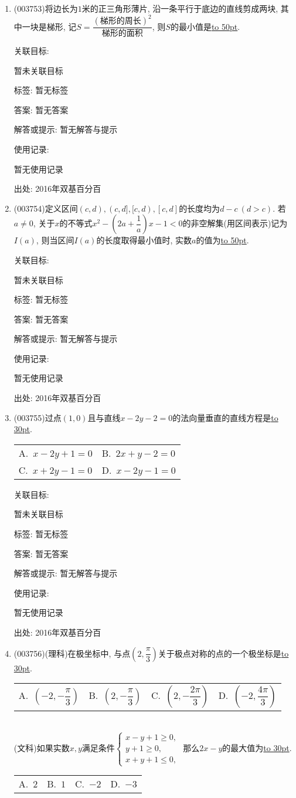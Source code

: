 \documentclass[10pt,a4paper]{article}
\newcommand{\blank}[1]{\underline{\hbox to #1pt{}}}
\newcommand{\twoch}[4]{\par\begin{tabular}{p{.46\textwidth}p{.46\textwidth}}
A.~#1& B.~#2\\
C.~#3& D.~#4
\end{tabular}}
\newcommand{\fourch}[4]{\par\begin{tabular}{p{.23\textwidth}p{.23\textwidth}p{.23\textwidth}p{.23\textwidth}}
A.~#1 &B.~#2& C.~#3& D.~#4
\end{tabular}}
\begin{document}
\begin{enumerate}[1.]
关联目标:

暂未关联目标



标签: 暂无标签

答案: 暂无答案

解答或提示: 暂无解答与提示

使用记录:

暂无使用记录


出处: 2016年双基百分百
\item { (003753)}将边长为$1$米的正三角形薄片, 沿一条平行于底边的直线剪成两块, 其中一块是梯形, 记$S=\dfrac{(\text{梯形的周长})^2}{\text{梯形的面积}}$, 则$S$的最小值是\blank{50}.


关联目标:

暂未关联目标



标签: 暂无标签

答案: 暂无答案

解答或提示: 暂无解答与提示

使用记录:

暂无使用记录


出处: 2016年双基百分百
\item { (003754)}定义区间$(c,d),(c,d],[c,d),[c,d]$的长度均为$d-c\ (d>c)$. 若$a\ne 0$, 关于$x$的不等式$x^2-\left(2a+\dfrac 1a\right)x-1<0$的非空解集(用区间表示)记为$I(a)$, 则当区间$I(a)$的长度取得最小值时, 实数$a$的值为\blank{50}.


关联目标:

暂未关联目标



标签: 暂无标签

答案: 暂无答案

解答或提示: 暂无解答与提示

使用记录:

暂无使用记录


出处: 2016年双基百分百
\item { (003755)}过点$(1,0)$且与直线$x-2y-2=0$的法向量垂直的直线方程是\blank{30}.
\twoch{$x-2y+1=0$}{$2x+y-2=0$}{$x+2y-1=0$}{$x-2y-1=0$}


关联目标:

暂未关联目标



标签: 暂无标签

答案: 暂无答案

解答或提示: 暂无解答与提示

使用记录:

暂无使用记录


出处: 2016年双基百分百
\item { (003756)}(理科)在极坐标中, 与点$\left(2,\dfrac{\pi}{3}\right)$关于极点对称的点的一个极坐标是\blank{30}.
\fourch{$\left(-2,-\dfrac{\pi}{3}\right)$}{$\left(2,-\dfrac{\pi}{3}\right)$}{$\left(2,-\dfrac{2\pi}{3}\right)$}{$\left(-2,\dfrac{4\pi}{3}\right)$}\\
(文科)如果实数$x,y$满足条件$\begin{cases}
x-y+1\ge 0,\\y+1\ge 0,\\x+y+1\le 0,
\end{cases}$ 那么$2x-y$的最大值为\blank{30}.
\fourch{$2$}{$1$}{$-2$}{$-3$}



\end{enumerate}
\end{document}
